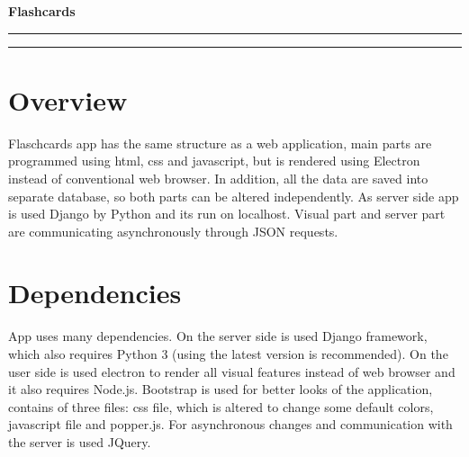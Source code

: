 \documentclass[12pt]{article}
\begin{document}
\begin{center}
  \textbf{\Huge Flashcards}\\
  \vspace{0.2cm}
  \rule{\textwidth}{0.5pt}
\end{center}
\tableofcontents
\begin{center}
  \rule{\textwidth}{0.5pt}
\end{center}
\hypertarget{overview}{%
\section{Overview}\label{overview}}

Flaschcards app has the same structure as a web application, main parts
are programmed using html, css and javascript, but is rendered using
Electron instead of conventional web browser. In addition, all the data
are saved into separate database, so both parts can be altered
independently. As server side app is used Django by Python and its run
on localhost. Visual part and server part are communicating
asynchronously through JSON requests.

\hypertarget{dependencies}{%
\section{Dependencies}\label{dependencies}}

App uses many dependencies. On the server side is used Django framework,
which also requires Python 3 (using the latest version is recommended).
On the user side is used electron to render all visual features instead
of web browser and it also requires Node.js. Bootstrap is used for
better looks of the application, contains of three files: css file,
which is altered to change some default colors, javascript file and
popper.js. For asynchronous changes and communication with the server is
used JQuery.
\end{document}
